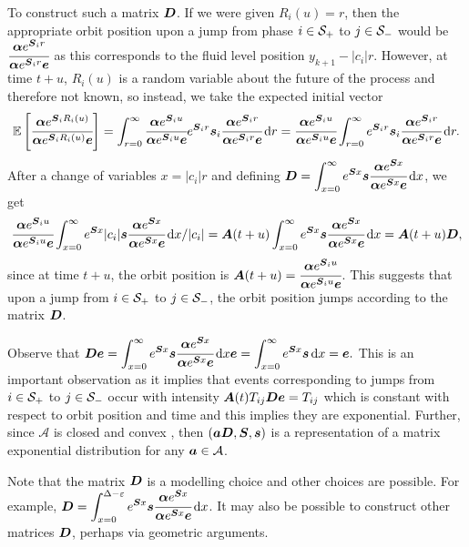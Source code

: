 To construct such a matrix \(\boldsymbol D\). If we were given \(R_i(u)=r\), then the appropriate orbit position upon a jump from phase \(i\in\mathcal{S}_+\) to \(j\in\mathcal{S}_-\) would be \(\cfrac{\boldsymbol\alpha e^{ \boldsymbol S_ir } }{\boldsymbol\alpha e^{\boldsymbol S_ir } \boldsymbol e}\) as this corresponds to the fluid level position \(y_{k+1}-|c_i|r\). However, at time \(t+u\), \(R_i(u)\) is a random variable about the future of the process and therefore not known, so instead, we take the expected initial vector 
\[\mathbb E \left[ \cfrac{\boldsymbol\alpha e^{ \boldsymbol S_iR_i(u) } }{\boldsymbol\alpha e^{\boldsymbol S_iR_i(u) } \boldsymbol e} \right] = \int_{r=0}^\infty \cfrac{\boldsymbol\alpha e^{\boldsymbol S_i u } }{\boldsymbol\alpha e^{\boldsymbol S_iu } \boldsymbol e} e^{\boldsymbol S_ir } \boldsymbol s_i \cfrac{\boldsymbol\alpha e^{ \boldsymbol S_ir } }{\boldsymbol\alpha e^{ \boldsymbol S_ir } \boldsymbol e}\, \mathrm{d} r = \cfrac{\boldsymbol\alpha e^{\boldsymbol S_i u } }{\boldsymbol\alpha e^{\boldsymbol S_iu } \boldsymbol e} \int_{r=0}^\infty e^{\boldsymbol S_ir } \boldsymbol s_i\cfrac{\boldsymbol\alpha e^{ \boldsymbol S_ir } }{\boldsymbol\alpha e^{ \boldsymbol S_ir } \boldsymbol e}\, \mathrm{d} r.\]
After a change of variables \(x=|c_i|r\) and defining \(\boldsymbol D = \displaystyle \int_{x=0}^\infty e^{\boldsymbol S x }\boldsymbol s \cfrac{\boldsymbol\alpha e^{ \boldsymbol Sx } }{\boldsymbol\alpha e^{ \boldsymbol Sx } \boldsymbol e}\, \mathrm{d} x\), we get 
\[\cfrac{\boldsymbol\alpha e^{\boldsymbol S_i u } }{\boldsymbol\alpha e^{\boldsymbol S_iu } \boldsymbol e} \int_{x=0}^\infty e^{\boldsymbol S x }|c_i| \boldsymbol s \cfrac{\boldsymbol\alpha e^{ \boldsymbol Sx } }{\boldsymbol\alpha e^{ \boldsymbol Sx } \boldsymbol e}\, \mathrm{d} x/|c_i| = \boldsymbol A(t+u)\int_{x=0}^\infty e^{\boldsymbol S x }\boldsymbol s \cfrac{\boldsymbol\alpha e^{ \boldsymbol Sx } }{\boldsymbol\alpha e^{ \boldsymbol Sx } \boldsymbol e}\, \mathrm{d} x = \boldsymbol A(t+u) \boldsymbol D,\]
since at time \(t+u\), the orbit position is \(\boldsymbol A(t+u) = \cfrac{\boldsymbol\alpha e^{\boldsymbol S_i u } }{\boldsymbol\alpha e^{\boldsymbol S_iu } \boldsymbol e}\). This suggests that upon a jump from \(i\in\mathcal{S}_+\) to \(j\in\mathcal{S}_-\), the orbit position jumps according to the matrix \(\boldsymbol D\). 

Observe that \(\boldsymbol D\boldsymbol e = \displaystyle \int_{x=0}^\infty e^{\boldsymbol S x }\boldsymbol s \cfrac{\boldsymbol\alpha e^{ \boldsymbol Sx } }{\boldsymbol\alpha e^{ \boldsymbol Sx } \boldsymbol e}\, \mathrm{d} x\boldsymbol e =\displaystyle \int_{x=0}^\infty e^{\boldsymbol S x }\boldsymbol s \, \mathrm{d} x=\boldsymbol e.\) This is an important observation as it implies that events corresponding to jumps from \(i\in\mathcal{S}_+\) to \(j\in\mathcal{S}_-\) occur with intensity \(\boldsymbol A(t)T_{ij}\boldsymbol D\boldsymbol e = T_{ij}\) which is constant with respect to orbit position and time and this implies they are exponential. Further, since \(\mathcal A\) is closed and convex \citep{MEinAP}, then \((\boldsymbol a \boldsymbol D,\boldsymbol S,\boldsymbol s)\) is a representation of a matrix exponential distribution for any \(\boldsymbol a\in\mathcal A\). 

Note that the matrix \(\boldsymbol D\) is a modelling choice and other choices are possible. For example, \(\displaystyle \boldsymbol D = \int_{x=0}^{\Delta-\varepsilon}e^{\boldsymbol S x }\boldsymbol s \cfrac{\boldsymbol\alpha e^{ \boldsymbol Sx } }{\boldsymbol\alpha e^{ \boldsymbol Sx } \boldsymbol e}\, \mathrm{d} x\). It may also be possible to construct other matrices \(\boldsymbol D\), perhaps via geometric arguments. 

